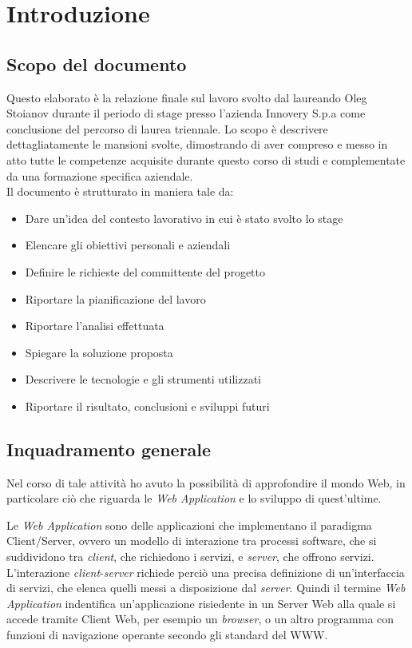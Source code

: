 \chapter{Introduzione}
\label{chap:introduzione}

\section{Scopo del documento}
\label{sec:scopodeldocumento}
Questo elaborato è la relazione finale sul lavoro svolto dal laureando Oleg Stoianov durante il periodo di stage presso l’azienda Innovery S.p.a come conclusione del percorso di laurea triennale. Lo scopo è descrivere dettagliatamente le mansioni svolte, dimostrando di aver compreso e messo in atto tutte le competenze acquisite durante questo corso di studi e complementate da una formazione specifica aziendale. \\



Il documento è strutturato in maniera tale da:
\begin{itemize}
    \item Dare un'idea del contesto lavorativo in cui è stato svolto lo stage
    \item Elencare gli obiettivi personali e aziendali
    \item Definire le richieste del committente del progetto
    \item Riportare la pianificazione del lavoro
    \item Riportare l'analisi effettuata
    \item Spiegare la soluzione proposta
    \item Descrivere le tecnologie e gli strumenti utilizzati
    \item Riportare il risultato, conclusioni e sviluppi futuri
\end{itemize}

\clearpage


\section{Inquadramento generale}
\label{sec:inqgenerale}
\hypertarget{introduzione}{}
Nel corso di tale attività ho avuto la possibilità di approfondire il mondo Web, in particolare ciò che riguarda le \textit{Web Application} e lo sviluppo di quest'ultime.

Le \textit{Web Application} sono delle applicazioni che implementano il  paradigma  Client/Server, ovvero un modello  di  interazione  tra  processi  software, che si suddividono tra \textit{client}, che richiedono i servizi, e \textit{server}, che offrono servizi. L’interazione  \textit{client}-\textit{server}  richiede  perciò  una  precisa  definizione  di  un’interfaccia  di  servizi,  che  elenca quelli messi a disposizione dal \textit{server}. Quindi il termine \textit{Web Application} indentifica un'applicazione risiedente  in  un  Server  Web  alla  quale  si  accede  tramite  Client Web, per esempio un \textit{browser},
o un altro programma con funzioni di navigazione operante secondo gli standard del \gls{WWW}.

